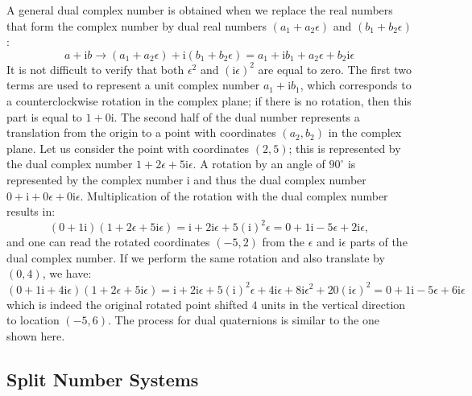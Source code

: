 A general dual complex number is obtained when we replace the real numbers that form the complex number by dual real numbers $(a_1+a_2\epsilon)$ and $(b_1+b_2\epsilon)$:
\[
	a+\mathrm{i}b \rightarrow (a_1+a_2\epsilon)+\mathrm{i}(b_1+b_2\epsilon) = a_1+\mathrm{i} b_1 + a_2\epsilon + b_2\mathrm{i}\epsilon
\]
It is not difficult to verify that both $\epsilon^2$ and $(\mathrm{i}\epsilon)^2$ are equal to zero.  The first two terms are used to represent a unit complex number $a_1+\mathrm{i} b_1$, which corresponds to a counterclockwise rotation in the complex plane; if there is no rotation, then this part is equal to $1+0\mathrm{i}$.  The second half of the dual number represents a translation from the origin to a point with coordinates $(a_2,b_2)$ in the complex plane.  Let us consider the point with coordinates $(2,5)$; this is represented by the dual complex number $1+2\epsilon+5\mathrm{i}\epsilon$.  A rotation by an angle of $90^{\circ}$ is represented by the complex number $\mathrm{i}$ and thus the dual complex number $0+\mathrm{i}+0\epsilon+0\mathrm{i}\epsilon$.  Multiplication of the rotation with the dual complex number results in:
\[
 (0+1\mathrm{i}) (1+2\epsilon+5\mathrm{i}\epsilon) = \mathrm{i} + 2\mathrm{i}\epsilon + 5 (\mathrm{i})^2\epsilon = 0 + 1\mathrm{i}-5\epsilon + 2\mathrm{i}\epsilon,
\]
and one can read the rotated coordinates $(-5,2)$ from the $\epsilon$ and $\mathrm{i}\epsilon$ parts of the dual complex number.  If we perform the same rotation and also translate by $(0,4)$, we have:
\[
 (0+1\mathrm{i}+4\mathrm{i}\epsilon) (1+2\epsilon+5\mathrm{i}\epsilon) = \mathrm{i} + 2\mathrm{i}\epsilon + 5 (\mathrm{i})^2\epsilon +4\mathrm{i}\epsilon +8\mathrm{i}\epsilon^2+20(\mathrm{i}\epsilon)^2 = 0 + 1\mathrm{i}-5\epsilon + 6\mathrm{i}\epsilon
\]
which is indeed the original rotated point shifted $4$ units in the vertical direction to location $(-5,6)$.  The process for dual quaternions is similar to the one shown here. 


\subsection{Split Number Systems}

















